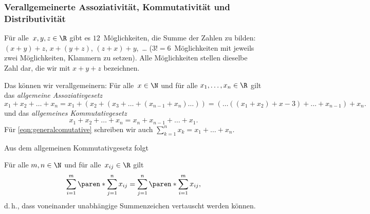 \documentclass[a4paper]{article}
\begin{document}
\subsubsection{Verallgemeinerte Assoziativität, Kommutativität und Distributivität}

\begin{remark}
    Für alle~$x, y, z \in \R$ gibt es $12$~Möglichkeiten, die Summe der Zahlen zu bilden: $(x + y) + z$, $x + (y + z)$, $(z + x) + y$,~\dots{} ($3! = 6$~Möglichkeiten mit jeweils zwei Möglichkeiten, Klammern zu setzen). Alle Möglichkeiten stellen dieselbe Zahl dar, die wir mit $x + y + z$ bezeichnen.

    Das können wir verallgemeinern: Für alle~$x \in \N$ und für alle $x_1, \dots, x_n \in \R$ gilt das \emph{allgemeine Assoziativgesetz}
    \begin{equation*}
        x_1 + x_2 + \dots + x_n = x_1 + (x_2 + (x_3 + \dots + (x_{n-1} + x_n) \dots )) = ( \dots ((x_1 + x_2) + x-3) + \dots + x_{n-1}) + x_n.
    \end{equation*}
    und das \emph{allgemeines Kommutativgesetz}
    \begin{equation}
        x_1 + x_2 + \dots + x_n = x_n + x_{n-1} + \dots + x_1. \label{eqn:generalcomutative}
    \end{equation}
    Für \cref{eqn:generalcomutative} schreiben wir auch $\sum_{k=1}^n x_k = x_1 + \dots + x_n$.
\end{remark}

Aus dem allgemeinen Kommutativgesetz folgt
\begin{theorem}[Doppelsumme]
    Für alle $m, n \in \N$ und für alle~$x_{ij} \in \R$ gilt
    \begin{equation*}
        \sum_{i=1}^m \paren*{\sum_{j=1}^n x_{ij}} = \sum_{j=1}^n \paren*{\sum_{i=1}^m x_{ij}},
    \end{equation*}
    d.\,h., dass voneinander unabhängige Summenzeichen vertauscht werden können.
\end{theorem}
\end{document}
